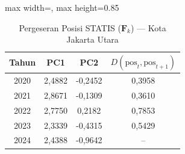 \begin{table}[H]
\centering
\caption{Pergeseran Posisi STATIS ($\mathbf{F}_k$) --- Kota Jakarta Utara} \label{tab:app2jarak_statis_skor_kota_jakarta_utara}
\begin{adjustbox}{max width=\textwidth, max height=0.85\textheight}
\begin{tabular}{|c|c|c|c|}
\hline
\textbf{Tahun} & \textbf{PC1} & \textbf{PC2} & \textbf{$D(\text{pos}_t, \text{pos}_{t+1})$} \\
\hline
2020 & 2,4882 & -0,2452 & 0,3958 \\
2021 & 2,8671 & -0,1309 & 0,3610 \\
2022 & 2,7750 & 0,2182 & 0,7853 \\
2023 & 2,3339 & -0,4315 & 0,5429 \\
2024 & 2,4388 & -0,9642 & -- \\
\hline
\end{tabular}
\end{adjustbox}
\end{table}